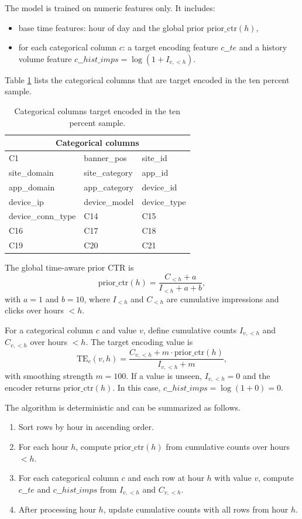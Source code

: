 The model is trained on numeric features only.
It includes:
\begin{itemize}
  \item base time features: hour of day and the global prior $\mathrm{prior\_ctr}(h)$,
  \item for each categorical column $c$: a target encoding feature $c\_\_te$ and a history volume feature $c\_\_hist\_imps=\log(1+I_{v,<h})$.
\end{itemize}

Table \ref{tab:cat_cols} lists the categorical columns that are target encoded in the ten percent sample.

\begin{table}[t]
  \centering
  \small
  \begin{tabular}{lll}
    \toprule
    \multicolumn{3}{c}{Categorical columns} \\
    \midrule
    C1 & banner\_pos & site\_id \\
    site\_domain & site\_category & app\_id \\
    app\_domain & app\_category & device\_id \\
    device\_ip & device\_model & device\_type \\
    device\_conn\_type & C14 & C15 \\
    C16 & C17 & C18 \\
    C19 & C20 & C21 \\
    \bottomrule
  \end{tabular}
  \caption{Categorical columns target encoded in the ten percent sample.}
  \label{tab:cat_cols}
\end{table}

The global time-aware prior CTR is
\[
\mathrm{prior\_ctr}(h) = \frac{C_{<h} + a}{I_{<h} + a + b},
\]
with $a=1$ and $b=10$, where $I_{<h}$ and $C_{<h}$ are cumulative impressions and clicks over hours $< h$.

For a categorical column $c$ and value $v$, define cumulative counts $I_{v,<h}$ and $C_{v,<h}$ over hours $<h$.
The target encoding value is
\[
\mathrm{TE}_c(v,h) = \frac{C_{v,<h} + m \cdot \mathrm{prior\_ctr}(h)}{I_{v,<h} + m},
\]
with smoothing strength $m=100$.
If a value is unseen, $I_{v,<h}=0$ and the encoder returns $\mathrm{prior\_ctr}(h)$.
In this case, $c\_\_hist\_imps=\log(1+0)=0$.

The algorithm is deterministic and can be summarized as follows.
\begin{enumerate}
  \item Sort rows by hour in ascending order.
  \item For each hour $h$, compute $\mathrm{prior\_ctr}(h)$ from cumulative counts over hours $<h$.
  \item For each categorical column $c$ and each row at hour $h$ with value $v$, compute $c\_\_te$ and $c\_\_hist\_imps$ from $I_{v,<h}$ and $C_{v,<h}$.
  \item After processing hour $h$, update cumulative counts with all rows from hour $h$.
\end{enumerate}

